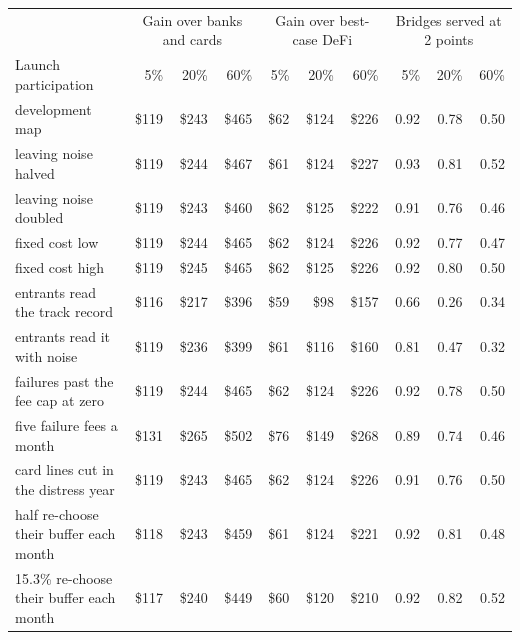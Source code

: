 \begin{tabular}{lrrrrrrrrr}
\toprule
 & \multicolumn{3}{c}{Gain over banks and cards} & \multicolumn{3}{c}{Gain over best-case DeFi} & \multicolumn{3}{c}{Bridges served at 2 points} \\
Launch participation & 5\% & 20\% & 60\% & 5\% & 20\% & 60\% & 5\% & 20\% & 60\% \\
\midrule
development map & \$119 & \$243 & \$465 & \$62 & \$124 & \$226 & 0.92 & 0.78 & 0.50 \\
\midrule
leaving noise halved & \$119 & \$244 & \$467 & \$61 & \$124 & \$227 & 0.93 & 0.81 & 0.52 \\
leaving noise doubled & \$119 & \$243 & \$460 & \$62 & \$125 & \$222 & 0.91 & 0.76 & 0.46 \\
fixed cost low & \$119 & \$244 & \$465 & \$62 & \$124 & \$226 & 0.92 & 0.77 & 0.47 \\
fixed cost high & \$119 & \$245 & \$465 & \$62 & \$125 & \$226 & 0.92 & 0.80 & 0.50 \\
entrants read the track record & \$116 & \$217 & \$396 & \$59 & \$98 & \$157 & 0.66 & 0.26 & 0.34 \\
entrants read it with noise & \$119 & \$236 & \$399 & \$61 & \$116 & \$160 & 0.81 & 0.47 & 0.32 \\
failures past the fee cap at zero & \$119 & \$244 & \$465 & \$62 & \$124 & \$226 & 0.92 & 0.78 & 0.50 \\
five failure fees a month & \$131 & \$265 & \$502 & \$76 & \$149 & \$268 & 0.89 & 0.74 & 0.46 \\
card lines cut in the distress year & \$119 & \$243 & \$465 & \$62 & \$124 & \$226 & 0.91 & 0.76 & 0.50 \\
half re-choose their buffer each month & \$118 & \$243 & \$459 & \$61 & \$124 & \$221 & 0.92 & 0.81 & 0.48 \\
15.3\% re-choose their buffer each month & \$117 & \$240 & \$449 & \$60 & \$120 & \$210 & 0.92 & 0.82 & 0.52 \\
\bottomrule
\end{tabular}
